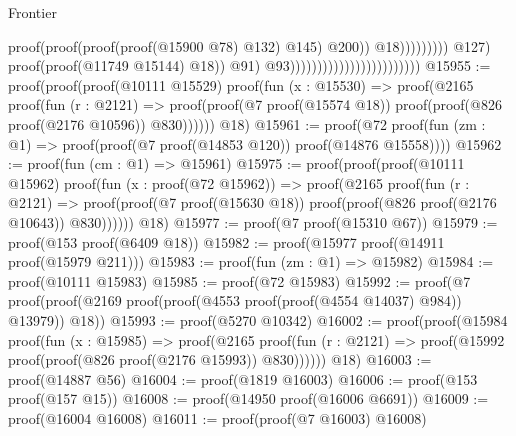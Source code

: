 \begin{lexlean}{Frontier}
\begin{coremodule}
                                                                                                          proof(proof(proof(proof(@15900
                                                                                                                    @78)
                                                                                                                  @132)
                                                                                                                @145)
                                                                                                              @200))
                                                                                                        @18)))))))))
                                                                          @127)
                                                                        proof(proof(@11749 @15144)
                                                                            @18))
                                                                      @91)
                                                                    @93))))))))))))))))))))))))
@15955 := proof(proof(proof(@10111 @15529)
        proof(fun (x : @15530) =>
          proof(@2165
              proof(fun (r : @2121) =>
                proof(proof(@7 proof(@15574 @18)) proof(proof(@826 proof(@2176 @10596)) @830))))))
      @18)
@15961 := proof(@72
      proof(fun (zm : @1) => proof(proof(@7 proof(@14853 @120)) proof(@14876 @15558))))
@15962 := proof(fun (cm : @1) => @15961)
@15975 := proof(proof(proof(@10111 @15962)
        proof(fun (x : proof(@72 @15962)) =>
          proof(@2165
              proof(fun (r : @2121) =>
                proof(proof(@7 proof(@15630 @18)) proof(proof(@826 proof(@2176 @10643)) @830))))))
      @18)
@15977 := proof(@7 proof(@15310 @67))
@15979 := proof(@153 proof(@6409 @18))
@15982 := proof(@15977 proof(@14911 proof(@15979 @211)))
@15983 := proof(fun (zm : @1) => @15982)
@15984 := proof(@10111 @15983)
@15985 := proof(@72 @15983)
@15992 := proof(@7
      proof(proof(@2169 proof(proof(@4553 proof(proof(@4554 @14037) @984)) @13979)) @18))
@15993 := proof(@5270 @10342)
@16002 := proof(proof(@15984
        proof(fun (x : @15985) =>
          proof(@2165
              proof(fun (r : @2121) => proof(@15992 proof(proof(@826 proof(@2176 @15993)) @830))))))
      @18)
@16003 := proof(@14887 @56)
@16004 := proof(@1819 @16003)
@16006 := proof(@153 proof(@157 @15))
@16008 := proof(@14950 proof(@16006 @6691))
@16009 := proof(@16004 @16008)
@16011 := proof(proof(@7 @16003) @16008)

\end{coremodule}
\end{lexlean}
